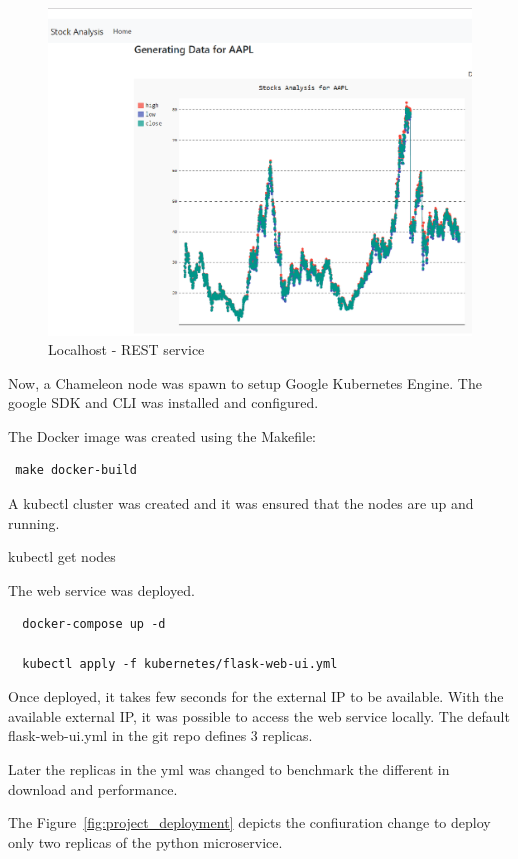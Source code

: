 \begin{figure}[htb]
	\centering\includegraphics[width=\columnwidth]{images/hid_417_localhost.png}
  \caption{Localhost - REST service}
  \label{fig:project_localhost}
\end{figure}

Now, a Chameleon node was spawn to setup Google Kubernetes Engine. The google
SDK and CLI was installed and configured. 

The Docker image was created using the Makefile:
\begin{verbatim}
 make docker-build
\end{verbatim}
A kubectl cluster was created and it was ensured that the nodes are up and
running.

kubectl get nodes

The web service was deployed.

\begin{verbatim}
  docker-compose up -d

  kubectl apply -f kubernetes/flask-web-ui.yml
\end{verbatim}

Once deployed, it takes few seconds for the external IP to be available. With
the available external IP, it was possible to access the web service locally.
The default flask-web-ui.yml in the git repo defines 3 replicas.

Later the replicas in the yml was changed to benchmark the different in
download and performance.

The Figure~\ref{fig:project_deployment} depicts the confiuration change to
deploy only two replicas of the python microservice.

